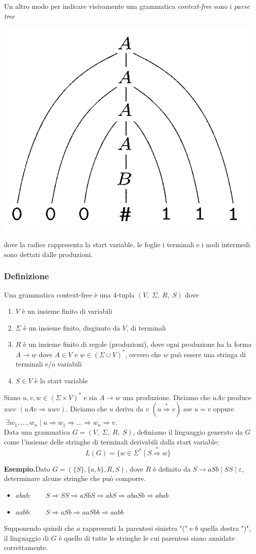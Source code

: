 \documentclass[italian]{article}
\newcommand{\taleche}{\;|\;}
\let\oldexists\exists
\renewcommand{\exists}{\text{$\;\oldexists$}}
\newcommand{\example}{\noindent\textbf{Esempio.\quad}}
\newcommand{\derive}{\overset{*}{\Rightarrow}}
\newcommand{\To}{\Rightarrow}
\begin{document}
\noindent
Un altro modo per indicare visivamente una grammatica \textit{context-free} sono i \textit{parse tree}
\begin{center}
	\includegraphics[width=0.3\linewidth]{images/parse_tree}
\end{center}
dove la radice rappresenta la start variable, le foglie i terminali e i nodi intermedi sono dettati dalle produzioni.
\pagebreak
\subsubsection{Definizione}
Una grammatica context-free è una $4$-tupla $(V,\;\Sigma,\;R,\;S)$ dove
\begin{enumerate}
	\item $V$ è un insieme finito di variabili
	\item $\Sigma$ è un insieme finito, disgiunto da $V$, di terminali
	\item $R$ è un insieme finito di regole (produzioni), dove ogni produzione ha la forma $A \to w$ dove $A \in V$ e $w \in (\Sigma \cup V)^*$, ovvero che $w$ può essere una stringa di terminali e/o variabili
	\item $S \in V$ è la start variable
\end{enumerate}
Siano $u,v,w \in (\Sigma \times V)^*$ e sia $A \to w$ una produzione. Diciamo che $uAv$ produce $uwv$ $(uAv \Rightarrow uwv)$. Diciamo che $u$ deriva da $v$ $(u \derive v)$ sse $u=v$ oppure $\exists w_1,\dots,w_n \taleche u \Rightarrow w_1 \Rightarrow \dots \Rightarrow w_n \Rightarrow v$.  \\

\noindent
Data una grammatica $G = (V,\;\Sigma,\;R,\;S)$, definiamo il linguaggio generato da $G$ come l'insieme delle stringhe di terminali derivabili dalla start variable:
\[
	L(G) = \{ w \in \Sigma^* \taleche S \derive w \}
\]

\example Dato $G = (\{S\},\{a,b\},R,S)$, dove $R$ è definito da $S \to aSb \taleche SS \taleche \varepsilon$, determinare alcune stringhe che può comporre.
\begin{itemize}
	\item $abab: \qquad S \To SS \To aSbS \To abS \To abaSb \To abab$
	\item $aabb: \qquad S \To aSb \To aaSbb \To aabb$
\end{itemize}
Supponendo quindi che $a$ rappresenti la parentesi sinistra "(" e $b$ quella destra ")", il linguaggio di $G$ è quello di tutte le stringhe le cui parentesi siano annidate correttamente. \\
\end{document}
